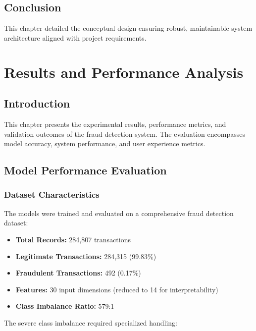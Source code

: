 \documentclass[12pt,a4paper,twoside]{report}
\begin{document}
\section{Conclusion}

This chapter detailed the conceptual design ensuring robust, maintainable system architecture aligned with project requirements.

\chapter{Results and Performance Analysis}

\section{Introduction}

This chapter presents the experimental results, performance metrics, and validation outcomes of the fraud detection system. The evaluation encompasses model accuracy, system performance, and user experience metrics.

\section{Model Performance Evaluation}

\subsection{Dataset Characteristics}

The models were trained and evaluated on a comprehensive fraud detection dataset:

\begin{itemize}
    \item \textbf{Total Records:} 284,807 transactions
    \item \textbf{Legitimate Transactions:} 284,315 (99.83\%)
    \item \textbf{Fraudulent Transactions:} 492 (0.17\%)
    \item \textbf{Features:} 30 input dimensions (reduced to 14 for interpretability)
    \item \textbf{Class Imbalance Ratio:} 579:1
\end{itemize}

The severe class imbalance required specialized handling:
\end{document}
